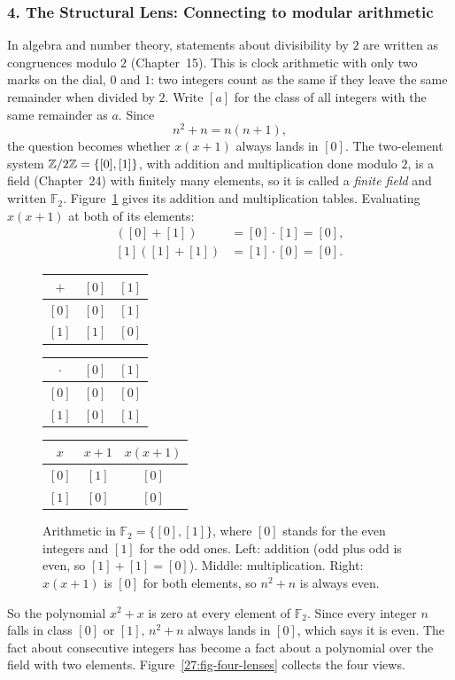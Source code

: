 \subsubsection{4. The Structural Lens: Connecting to modular arithmetic}
In algebra and number theory, statements about divisibility by $2$ are written as congruences modulo $2$ (Chapter~15). This is clock arithmetic with only two marks on the dial, $0$ and $1$: two integers count as the same if they leave the same remainder when divided by $2$. Write $[a]$ for the class of all integers with the same remainder as $a$. Since
\[
n^2 + n = n(n+1),
\]
the question becomes whether $x(x+1)$ always lands in $[0]$.
The two-element system $\mathbb{Z}/2\mathbb{Z} = \{[0], [1]\}$, with addition and multiplication done modulo $2$, is a field (Chapter~24) with finitely many elements, so it is called a \emph{finite field} and written $\mathbb{F}_2$. Figure~\ref{27:fig-f2-tables} gives its addition and multiplication tables. Evaluating $x(x+1)$ at both of its elements:
\begin{align*}
[0]([0] + [1]) &= [0] \cdot [1] = [0], \\
[1]([1] + [1]) &= [1] \cdot [0] = [0].
\end{align*}
\begin{figure}[htbp]
\centering
\small
\begin{tabular}{c|cc}
$+$ & $[0]$ & $[1]$ \\ \hline
$[0]$ & $[0]$ & $[1]$ \\
$[1]$ & $[1]$ & $[0]$
\end{tabular}
\qquad\qquad
\begin{tabular}{c|cc}
$\cdot$ & $[0]$ & $[1]$ \\ \hline
$[0]$ & $[0]$ & $[0]$ \\
$[1]$ & $[0]$ & $[1]$
\end{tabular}
\qquad\qquad
\begin{tabular}{ccc}
$x$ & $x+1$ & $x(x+1)$ \\ \hline
$[0]$ & $[1]$ & $[0]$ \\
$[1]$ & $[0]$ & $[0]$
\end{tabular}
\caption{Arithmetic in $\mathbb{F}_2 = \{[0],[1]\}$, where $[0]$ stands for the even integers and $[1]$ for the odd ones. Left: addition (odd plus odd is even, so $[1]+[1]=[0]$). Middle: multiplication. Right: $x(x+1)$ is $[0]$ for both elements, so $n^2+n$ is always even.}
\label{27:fig-f2-tables}
\end{figure}

So the polynomial $x^2 + x$ is zero at every element of $\mathbb{F}_2$. Since every integer $n$ falls in class $[0]$ or $[1]$, $n^2 + n$ always lands in $[0]$, which says it is even. The fact about consecutive integers has become a fact about a polynomial over the field with two elements. Figure~\ref{27:fig-four-lenses} collects the four views.

